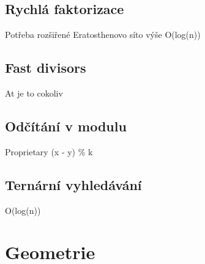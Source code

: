 \documentclass[10pt, a4paper, twoside]{article}
\begin{document}
\subsection{Rychlá faktorizace}
Potřeba rozšiřené Eratosthenovo síto výše
O(log(n))


\subsection{Fast divisors}
At je to cokoliv


\subsection{Odčítání v modulu}
Proprietary (x - y) \% k


\subsection{Ternární vyhledávání}
O(log(n))


\newpage

\section{Geometrie}

\end{document}
